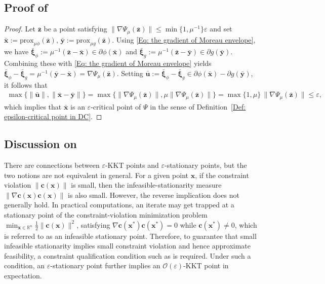 \documentclass{article}
\theoremstyle{plain}
\theoremstyle{definition}
\theoremstyle{remark}
\newcommand{\RR}{\mathbb{R}}
\newcommand{\prox}{\mathrm{prox}}
\newcommand{\bx}{\bm{x}}
\newcommand{\bc}{\bm{c}}
\newcommand{\bu}{\bm{u}}
\newcommand{\bz}{\bm{z}}
\newcommand{\by}{\bm{y}}
\newcommand{\bxi}{\bm{\xi}}
\newcommand{\calO}{\mathcal{O}}
\numberwithin{equation}{section}
\begin{document}
\subsection{Proof of }
\label{App: proof of prop2.2}
\begin{proof}
Let $\bar{\bz}$ be a point satisfying
$\|\nabla \Psi_{\mu}(\bar{\bz})\|\le \min\{1,\mu^{-1}\}\varepsilon$ and set
\(
  \bar{\bx} := \prox_{\mu \phi}(\bar{\bz}),\,
  \bar{\by} := \prox_{\mu g}(\bar{\bz}).
\)
Using \eqref{Eq: the gradient of Moreau envelope}, we have
\(
  \bar{\bxi}_{\phi} := \mu^{-1}(\bar{\bz}-\bar{\bx}) \in \partial \phi(\bar{\bx})
\) and \(
  \bar{\bxi}_{g} := \mu^{-1}(\bar{\bz}-\bar{\by}) \in \partial g(\bar{\by}).
\)
Combining these with \eqref{Eq: the gradient of Moreau envelope} yields
\(
  \bar{\bxi}_{\phi} - \bar{\bxi}_{g}
    = \mu^{-1}(\bar{\by}-\bar{\bx})
    = \nabla \Psi_{\mu}(\bar{\bz}).
\)
Setting $\bar{\bu}:=\bar{\bxi}_{\phi}-\bar{\bxi}_{g}\in\partial\phi(\bar{\bx})-\partial g(\bar{\by})$, it follows that
\begin{align*}
  \max\bigl\{\| \bar{\bu} \|,
             \|\bar{\bx}-\bar{\by}\|\bigr\}  = \max\bigl\{\|\nabla \Psi_{\mu}(\bar{\bz})\|,
                  \mu\|\nabla \Psi_{\mu}(\bar{\bz})\|\bigr\} = \max\{1,\mu\}\,\|\nabla \Psi_{\mu}(\bar{\bz})\| \leq \varepsilon,
\end{align*}
which implies that $\bar{\bx}$ is an $\varepsilon$-critical point of \(\Psi\) in the sense of Definition~\ref{Def: epsilon-critical point in DC}.
\end{proof}

\subsection{Discussion on }
\label{Appendix: Discussion on Def 2.1}
There are connections between $\varepsilon$-KKT points and $\varepsilon$-stationary points, but the two notions are not equivalent in general.
For a given point $\bx$, if the constraint violation $\|\bc(\bx)\|$ is small, then the infeasible-stationarity measure
$\|\nabla \bc(\bx)\bc(\bx)\|$ is also small. However, the reverse implication does not generally hold. In practical computations, an iterate may get trapped at a stationary point of the constraint-violation minimization problem $\min_{\bx\in\RR^{n}} \tfrac12\|\bc(\bx)\|^{2}$, satisfying $\nabla \bc(\bx^*)\bc(\bx^*)=0$ while $\bc(\bx^*)\neq 0$, which is referred to as an
infeasible stationary point. Therefore, to guarantee that small infeasible stationarity implies small constraint violation and hence approximate feasibility,
a constraint qualification condition such as  is required. Under such a condition, an $\varepsilon$-stationary point further implies an $\calO(\varepsilon)$-KKT point in expectation.
\end{document}
